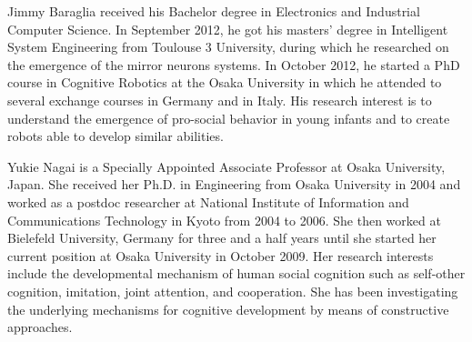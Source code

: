 \documentclass[journal]{IEEEtran}
\begin{document}
\begin{IEEEbiography}{Jimmy Baraglia}
received his Bachelor degree in Electronics and Industrial Computer Science. In September 2012, he got his masters' degree in Intelligent System Engineering from Toulouse 3 University, during which he researched on the emergence of the mirror neurons systems. In October 2012, he started a PhD course in Cognitive Robotics at the Osaka University in which he attended to several exchange courses in Germany and in Italy. His research interest is to understand the emergence of pro-social behavior in young infants and to create robots able to develop similar abilities.
\end{IEEEbiography}

\begin{IEEEbiography}{Yukie Nagai}
is a Specially Appointed Associate Professor at Osaka University, Japan. She received her Ph.D. in Engineering from Osaka University in 2004 and worked as a postdoc researcher at National Institute of Information and Communications Technology in Kyoto from 2004 to 2006. She then worked at Bielefeld University, Germany for three and a half years until she started her current position at Osaka University in October 2009. Her research interests include the developmental mechanism of human social cognition such as self-other cognition, imitation, joint attention, and cooperation. She has been investigating the underlying mechanisms for cognitive development by means of constructive approaches.
\end{IEEEbiography}
\end{document}
